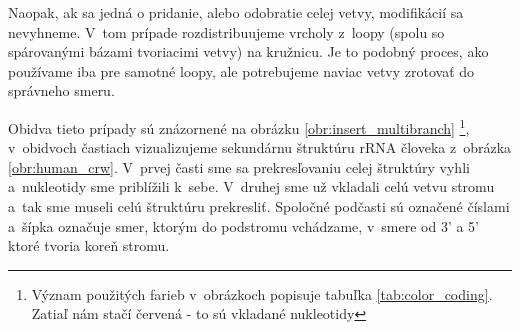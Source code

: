 Naopak, ak sa jedná o pridanie, alebo odobratie celej vetvy, modifikácií sa nevyhneme.
V~tom prípade rozdistribuujeme vrcholy z~loopy (spolu so spárovanými bázami tvoriacimi
vetvy) na kružnicu. Je to podobný proces, ako používame iba pre samotné loopy,
ale potrebujeme naviac vetvy zrotovať do správneho smeru.

Obidva tieto prípady sú znázornené na obrázku \ref{obr:insert_multibranch}%
\footnote{Význam použitých farieb v~obrázkoch popisuje tabuľka \ref{tab:color_coding}.
  Zatiaľ nám stačí červená - to sú vkladané nukleotidy},
v~obidvoch častiach vizualizujeme sekundárnu štruktúru rRNA človeka z~obrázka \ref{obr:human_crw}.
V~prvej časti sme sa prekresľovaniu celej štruktúry vyhli a~nukleotidy sme
priblížili k~sebe. V~druhej sme už vkladali celú vetvu stromu a~tak sme museli
celú štruktúru prekresliť. Spoločné podčasti sú označené číslami a~šípka označuje
smer, ktorým do podstromu vchádzame, v~smere od 3' a 5' ktoré tvoria koreň stromu.

